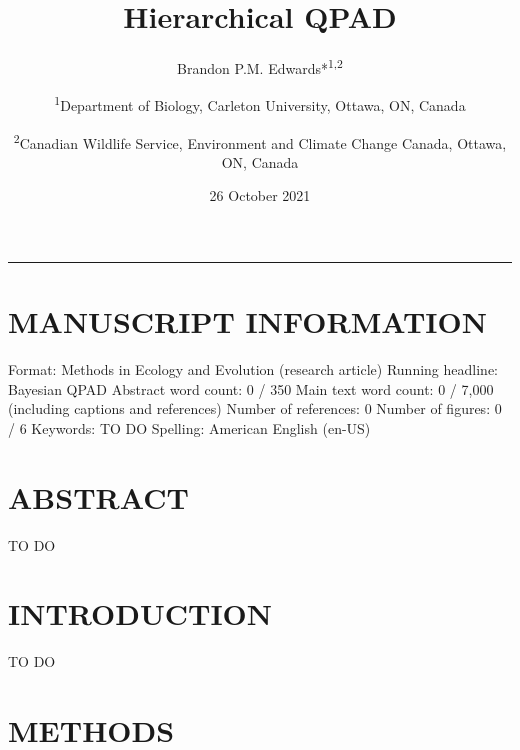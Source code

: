 \documentclass[
  11pt,
]{article}
\title{Hierarchical QPAD}
\author{\normalsize Brandon P.M. Edwards*\textsuperscript{1,2} \and \small \textsuperscript{1}Department of Biology, Carleton University,
Ottawa, ON, Canada \and \small \textsuperscript{2}Canadian Wildlife Service, Environment and
Climate Change Canada, Ottawa, ON, Canada}
\date{26 October 2021}
\begin{document}
\maketitle

\begin{center}\rule{0.5\linewidth}{0.5pt}\end{center}

\doublespacing
\vfill

\hypertarget{manuscript-information}{%
\section{MANUSCRIPT INFORMATION}\label{manuscript-information}}

Format: Methods in Ecology and Evolution (research article) \newline
Running headline: Bayesian QPAD \newline Abstract word count: 0 / 350
\newline Main text word count: 0 / 7,000 (including captions and
references) \newline Number of references: 0 \newline Number of figures:
0 / 6 \newline Keywords: TO DO \newline Spelling: American English
(en-US)

\clearpage
\linenumbers

\hypertarget{abstract}{%
\section{ABSTRACT}\label{abstract}}

\begin{spacing}{1.5}

TO DO

\end{spacing}

\clearpage

\hypertarget{introduction}{%
\section{INTRODUCTION}\label{introduction}}

TO DO

\clearpage

\hypertarget{methods}{%
\section{METHODS}\label{methods}}
\end{document}
